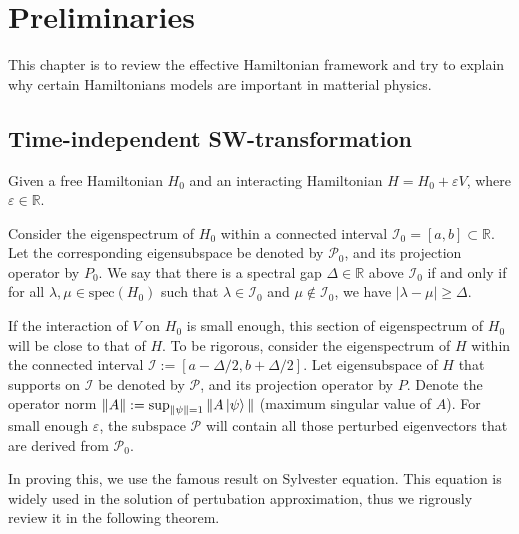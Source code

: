 
\chapter{Preliminaries}
\label{chap:effective-hamiltonian}

This chapter is to review the effective Hamiltonian framework and try to explain why certain Hamiltonians models are important in matterial physics.

\section{Time-independent SW-transformation}
\label{sec:effective-hamiltonian}

Given a free Hamiltonian $H_0$ and an interacting Hamiltonian $H = H_0 + \varepsilon V$, where $\varepsilon \in \mathbb{R}$.

\begin{definition}
\label{def:gap}
Consider the eigenspectrum of $H_0$ within a connected interval $\mathcal{I}_0 = [a,b] \subset \mathbb{R}$. Let the corresponding eigensubspace be denoted by $\mathcal{P}_0$, and its projection operator by $P_0$.
We say that there is a spectral gap $\Delta \in \mathbb{R}$ above $\mathcal{I}_0$ if and only if for all $\lambda, \mu \in \text{spec}(H_0)$ such that $\lambda \in \mathcal{I}_0$ and $\mu \notin \mathcal{I}_0$, we have $|\lambda - \mu| \geq \Delta$.
\end{definition}

If the interaction of $V$ on $H_0$ is small enough, this section of eigenspectrum of $H_0$ will be close to that of $H$.
To be rigorous, consider the eigenspectrum of $H$ within the connected interval $\mathcal{I} := [a-\Delta/2, b+\Delta/2]$.
Let eigensubspace of $H$ that supports on $\mathcal{I}$ be denoted by $\mathcal{P}$, and its projection operator by $P$.
Denote the operator norm $\|A\| := \sup_{\|\psi\|=1} \|A\ket{\psi}\|$ (maximum singular value of $A$).
For small enough $\varepsilon$, the subspace $\mathcal{P}$ will contain all those perturbed eigenvectors that are derived from $\mathcal{P}_0$.

In proving this, we use the famous result on Sylvester equation.
This equation is widely used in the solution of pertubation approximation, thus we rigrously review it in the following theorem.

